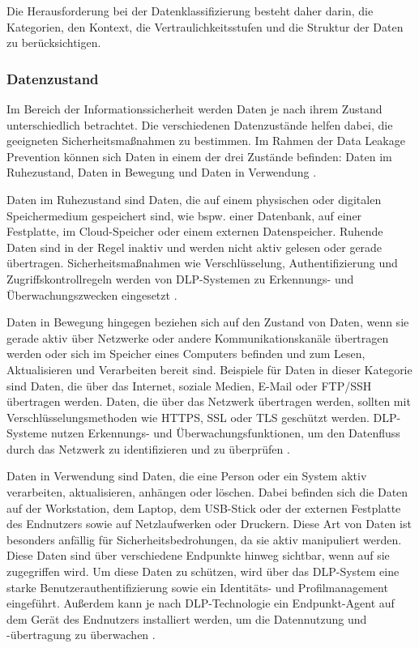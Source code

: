 Die Herausforderung bei der Datenklassifizierung besteht daher darin, die Kategorien, den Kontext, die Vertraulichkeitsstufen und die Struktur der Daten zu berücksichtigen.

\subsubsection{Datenzustand}
Im Bereich der Informationssicherheit werden Daten je nach ihrem Zustand unterschiedlich betrachtet. Die verschiedenen Datenzustände helfen dabei, die geeigneten Sicherheitsmaßnahmen zu bestimmen. Im Rahmen der Data Leakage Prevention können sich Daten in einem der drei Zustände befinden: Daten im Ruhezustand, Daten in Bewegung und Daten in Verwendung \cite{Shabtai.2012b}.

Daten im Ruhezustand sind Daten, die auf einem physischen oder digitalen Speichermedium gespeichert sind, wie bspw. einer Datenbank, auf einer Festplatte, im Cloud-Speicher oder einem externen Datenspeicher. Ruhende Daten sind in der Regel inaktiv und werden nicht aktiv gelesen oder gerade übertragen. Sicherheitsmaßnahmen wie Verschlüsselung, Authentifizierung und Zugriffskontrollregeln werden von DLP-Systemen zu Erkennungs- und Überwachungszwecken eingesetzt \cite{Shabtai.2012b}\cite{Shishodia.2022}.

Daten in Bewegung hingegen beziehen sich auf den Zustand von Daten, wenn sie gerade aktiv über Netzwerke oder andere Kommunikationskanäle übertragen werden oder sich im Speicher eines Computers befinden und zum Lesen, Aktualisieren und Verarbeiten bereit sind. Beispiele für Daten in dieser Kategorie sind Daten, die über das Internet, soziale Medien, E-Mail oder FTP/SSH übertragen werden. Daten, die über das Netzwerk übertragen werden, sollten mit Verschlüsselungsmethoden wie HTTPS, SSL oder TLS geschützt werden. DLP-Systeme nutzen Erkennungs- und Überwachungsfunktionen, um den Datenfluss durch das Netzwerk zu identifizieren und zu überprüfen \cite{Shabtai.2012b}\cite{Shishodia.2022}.

Daten in Verwendung sind Daten, die eine Person oder ein System aktiv verarbeiten, aktualisieren, anhängen oder löschen. Dabei befinden sich die Daten auf der Workstation, dem Laptop, dem USB-Stick oder der externen Festplatte des Endnutzers sowie auf Netzlaufwerken oder Druckern. Diese Art von Daten ist besonders anfällig für Sicherheitsbedrohungen, da sie aktiv manipuliert werden. Diese Daten sind über verschiedene Endpunkte hinweg sichtbar, wenn auf sie zugegriffen wird. Um diese Daten zu schützen, wird über das DLP-System eine starke Benutzerauthentifizierung sowie ein Identitäts- und Profilmanagement eingeführt. Außerdem kann je nach DLP-Technologie ein Endpunkt-Agent auf dem Gerät des Endnutzers installiert werden, um die Datennutzung und -übertragung zu überwachen \cite{Shabtai.2012b}\cite{Shishodia.2022}.

